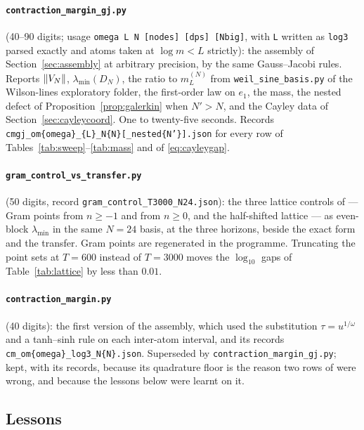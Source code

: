 \paragraph{\texttt{contraction\_margin\_gj.py}} (40--90 digits; usage
\texttt{omega L N [nodes] [dps] [Nbig]}, with \texttt{L} written as
\texttt{log3} parsed exactly and atoms taken at $\log m<L$ strictly): the
assembly of Section~\ref{sec:assembly} at arbitrary precision, by the same
Gauss--Jacobi rules. Reports $\lVert V_N\rVert$, $\lambda_{\min}(D_N)$, the ratio to
$m_L^{(N)}$ from \texttt{weil\_sine\_basis.py} of the Wilson-lines exploratory
folder, the first-order law on $e_1$, the mass, the nested defect of
Proposition~\ref{prop:galerkin} when $N'>N$, and the Cayley data of
Section~\ref{sec:cayleycoord}. One to twenty-five seconds. Records
\texttt{cmgj\_om\{omega\}\_\{L\}\_N\{N\}[\_nested\{N'\}].json} for every row of
Tables~\ref{tab:sweep}--\ref{tab:mass} and of \eqref{eq:cayleygap}.

\paragraph{\texttt{gram\_control\_vs\_transfer.py}} (50 digits, record
\texttt{gram\_control\_\allowbreak T3000\_N24.json}): the three lattice
controls of \cite[Section~3]{WilsonReview} --- Gram points from $n\geq-1$ and
from $n\geq0$, and the half-shifted lattice --- as even-block $\lambda_{\min}$ in
the same $N=24$ basis, at the three horizons, beside the exact form and the
transfer. Gram points are regenerated in the programme. Truncating the point
sets at $T=600$ instead of $T=3000$ moves the $\log_{10}$ gaps of
Table~\ref{tab:lattice} by less than $0.01$.

\paragraph{\texttt{contraction\_margin.py}} (40 digits): the first version of the
assembly, which used the substitution $\tau=u^{1/\omega}$ and a tanh--sinh rule
on each inter-atom interval, and its records \texttt{cm\_om\{omega\}\_log3\_N\{N\}.json}.
Superseded by \texttt{contraction\_margin\_gj.py}; kept, with its records,
because its quadrature floor is the reason two rows of \cite{ContractionNote}
were wrong, and because the lessons below were learnt on it.

\subsection*{Lessons}


